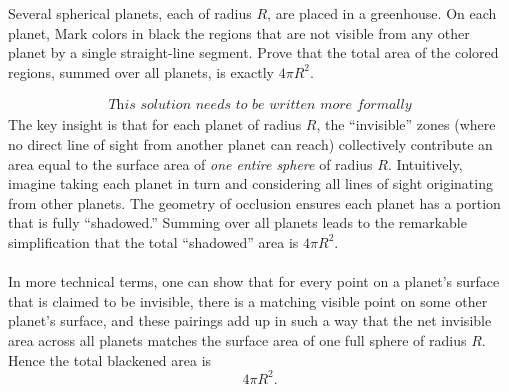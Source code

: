 \begin{problem}
    Several spherical planets, each of radius \( R \), are placed in a greenhouse. On each planet, Mark colors in black the regions that are not visible from any other planet by a single straight-line segment. Prove that the total area of the colored regions, summed over all planets, is exactly \( 4\pi R^{2} \).
\end{problem}
\begin{solution}
    \[
        \substack{\textit{This solution needs to be written more formally}}
    \]
    The key insight is that for each planet of radius \( R \), the ``invisible'' zones (where no direct line of sight from another planet can reach) collectively contribute an area equal to the surface area of \emph{one entire sphere} of radius \( R \). Intuitively, imagine taking each planet in turn and considering all lines of sight originating from other planets. The geometry of occlusion ensures each planet has a portion that is fully ``shadowed.'' Summing over all planets leads to the remarkable simplification that the total ``shadowed'' area is \( 4\pi R^2 \).
    \\\\
    In more technical terms, one can show that for every point on a planet's surface that is claimed to be invisible, there is a matching visible point on some other planet's surface, and these pairings add up in such a way that the net invisible area across all planets matches the surface area of one full sphere of radius \( R \). Hence the total blackened area is
    \[
        4\pi R^2.
    \]
\end{solution}
